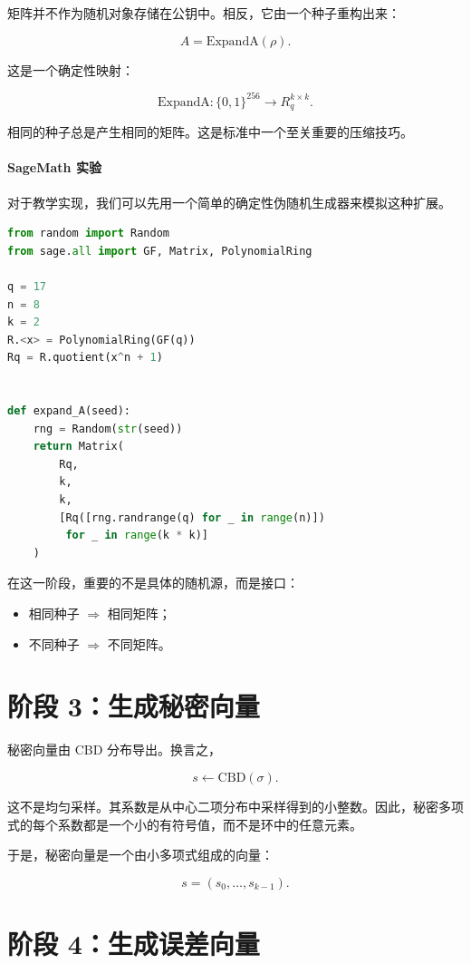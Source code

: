 矩阵并不作为随机对象存储在公钥中。相反，它由一个种子重构出来：

\[
A = \mathrm{ExpandA}(\rho).
\]

这是一个确定性映射：

\[
\mathrm{ExpandA}: \{0,1\}^{256} \to R_q^{k\times k}.
\]

相同的种子总是产生相同的矩阵。这是标准中一个至关重要的压缩技巧。

\paragraph{SageMath 实验}

对于教学实现，我们可以先用一个简单的确定性伪随机生成器来模拟这种扩展。

\begin{lstlisting}[language=Python]
from random import Random
from sage.all import GF, Matrix, PolynomialRing

q = 17
n = 8
k = 2
R.<x> = PolynomialRing(GF(q))
Rq = R.quotient(x^n + 1)


def expand_A(seed):
    rng = Random(str(seed))
    return Matrix(
        Rq,
        k,
        k,
        [Rq([rng.randrange(q) for _ in range(n)])
         for _ in range(k * k)]
    )
\end{lstlisting}

在这一阶段，重要的不是具体的随机源，而是接口：

\begin{itemize}
  \item 相同种子 $\Rightarrow$ 相同矩阵；
  \item 不同种子 $\Rightarrow$ 不同矩阵。
\end{itemize}

\section{阶段 3：生成秘密向量}

秘密向量由 CBD 分布导出。换言之，

\[
s \leftarrow \mathrm{CBD}(\sigma).
\]

这不是均匀采样。其系数是从中心二项分布中采样得到的小整数。因此，秘密多项式的每个系数都是一个小的有符号值，而不是环中的任意元素。

于是，秘密向量是一个由小多项式组成的向量：

\[
s = (s_0, \dots, s_{k-1}).
\]

\section{阶段 4：生成误差向量}

